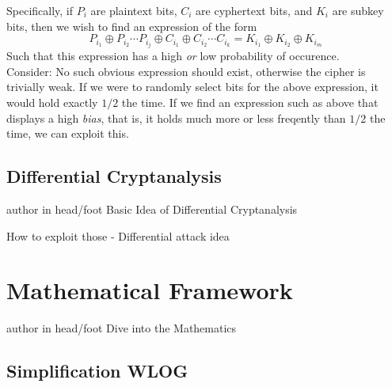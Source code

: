 \documentclass[9pt]{beamer}
\begin{document}
\begin{frame}
Specifically, if $P_{i}$ are plaintext bits, $C_{i}$ are cyphertext bits, and $K_{i}$ are subkey bits, then we wish to find an expression of the form
\[ P_{i_1} \oplus P_{i_2} \cdots P_{i_j} \oplus C_{i_1} \oplus C_{i_2} \cdots C_{i_k} = K_{i_1} \oplus K_{i_2} \oplus K_{i_m} \]
Such that this expression has a high \textit{or} low probability of occurence.\\
\vspace{5mm}
Consider: No such obvious expression should exist, otherwise the cipher is trivially weak. If we were to randomly select bits for the above expression, it would hold exactly $1/2$ the time. If we find an expression such as above that displays a high \textit{bias}, that is, it holds much more or less freqently than $1/2$ the time, we can exploit this.
\end{frame}


\subsection{Differential Cryptanalysis}
\begin{frame}
\begin{beamercolorbox}[ht=2.5ex,dp=1.125ex,center,rounded=true,shadow=true]{author in head/foot}
Basic Idea of Differential Cryptanalysis
\end{beamercolorbox}
\end{frame}

\begin{frame}
How to exploit those - Differential attack idea

\end{frame}

\section{Mathematical Framework}
\begin{frame}
\begin{beamercolorbox}[ht=2.5ex,dp=1.125ex,center,rounded=true,shadow=true]{author in head/foot}
Dive into the Mathematics
\end{beamercolorbox}
\end{frame}

\subsection{Simplification WLOG}
\end{document}
